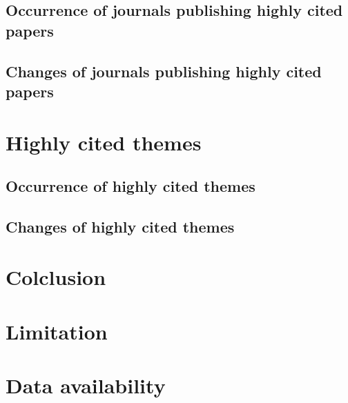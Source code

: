 \documentclass[12pt,a4paper,twocolumn,twoside]{ujsikpb}
\begin{document}
\subsection{Occurrence of journals publishing highly cited papers}

%


\subsection{Changes of journals publishing highly cited papers}
%







\section{Highly cited themes}
%


\subsection{Occurrence of highly cited themes}
%


\subsection{Changes of highly cited themes}
%


%




%


\section{Colclusion}
%


\section{Limitation}
%


\section{Data availability}
%


\balance


\end{document}
